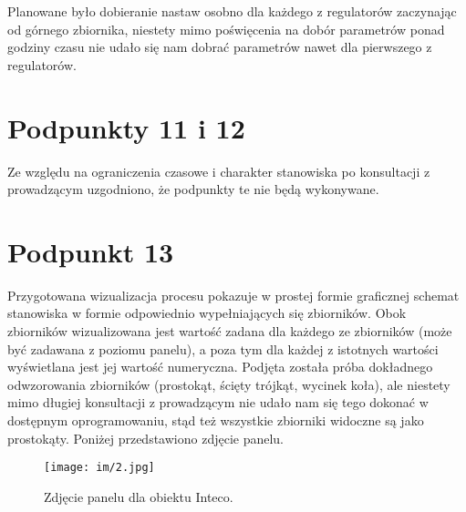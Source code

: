 Planowane było dobieranie nastaw osobno dla każdego z regulatorów zaczynając od górnego zbiornika, niestety mimo poświęcenia na dobór parametrów ponad godziny czasu nie udało się nam dobrać parametrów nawet dla pierwszego z regulatorów.

\chapter{Podpunkty 11 i 12}
Ze względu na ograniczenia czasowe i charakter stanowiska po konsultacji z prowadzącym uzgodniono, że podpunkty te nie będą wykonywane.

\chapter{Podpunkt 13}
Przygotowana wizualizacja procesu pokazuje w prostej formie graficznej schemat stanowiska w formie odpowiednio wypełniających się zbiorników. Obok zbiorników wizualizowana jest wartość zadana dla każdego ze zbiorników (może być zadawana z poziomu panelu), a poza tym dla każdej z istotnych wartości wyświetlana jest jej wartość numeryczna. Podjęta została próba dokładnego odwzorowania zbiorników (prostokąt, ścięty trójkąt, wycinek koła), ale niestety mimo długiej konsultacji z prowadzącym nie udało nam się tego dokonać w dostępnym oprogramowaniu, stąd też wszystkie zbiorniki widoczne są jako prostokąty. Poniżej przedstawiono zdjęcie panelu.

\begin{figure}[ht]
\centering
\texttt{[image: im/2.jpg]}
\caption{Zdjęcie panelu dla obiektu Inteco.}
\end{figure}

